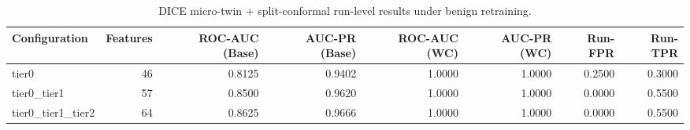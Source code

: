 \begin{table}[t]
\centering
\caption{DICE micro-twin + split-conformal run-level results under benign retraining.}
\label{tab:dice_full_overall}
\footnotesize
\begin{tabular}{lrrrrrrr}
\toprule
Configuration & Features & ROC-AUC (Base) & AUC-PR (Base) & ROC-AUC (WC) & AUC-PR (WC) & Run-FPR & Run-TPR \\
\midrule
tier0 & 46 & 0.8125 & 0.9402 & 1.0000 & 1.0000 & 0.2500 & 0.3000 \\
tier0_tier1 & 57 & 0.8500 & 0.9620 & 1.0000 & 1.0000 & 0.0000 & 0.5500 \\
tier0_tier1_tier2 & 64 & 0.8625 & 0.9666 & 1.0000 & 1.0000 & 0.0000 & 0.5500 \\
\bottomrule
\end{tabular}

\end{table}
